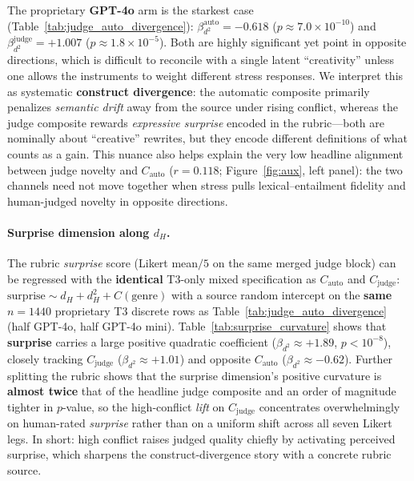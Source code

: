 \documentclass[sigconf,nonacm]{acmart}
\begin{document}
The proprietary \textbf{GPT-4o} arm is the starkest case (Table~\ref{tab:judge_auto_divergence}): $\beta_{d^2}^{\mathrm{auto}}{=}{-}0.618$ ($p{\approx}7.0{\times}10^{-10}$) and $\beta_{d^2}^{\mathrm{judge}}{=}{+}1.007$ ($p{\approx}1.8{\times}10^{-5}$).
Both are highly significant yet point in opposite directions, which is difficult to reconcile with a single latent ``creativity'' unless one allows the instruments to weight different stress responses.
We interpret this as systematic \textbf{construct divergence}: the automatic composite primarily penalizes \emph{semantic drift} away from the source under rising conflict, whereas the judge composite rewards \emph{expressive surprise} encoded in the rubric---both are nominally about ``creative'' rewrites, but they encode different definitions of what counts as a gain.
This nuance also helps explain the very low headline alignment between judge novelty and $C_{\mathrm{auto}}$ ($r{=}0.118$; Figure~\ref{fig:aux}, left panel): the two channels need not move together when stress pulls lexical--entailment fidelity and human-judged novelty in opposite directions.

\paragraph{Surprise dimension along $d_H$.}
The rubric \emph{surprise} score (Likert mean$/5$ on the same merged judge block) can be regressed with the \textbf{identical} T3-only mixed specification as $C_{\mathrm{auto}}$ and $C_{\mathrm{judge}}$: $\mathrm{surprise}{\sim} d_H{+}d_H^2{+}C(\mathrm{genre})$ with a source random intercept on the \textbf{same} $n{=}1440$ proprietary T3 discrete rows as Table~\ref{tab:judge_auto_divergence} (half GPT-4o, half GPT-4o mini).
Table~\ref{tab:surprise_curvature} shows that \textbf{surprise} carries a large positive quadratic coefficient ($\beta_{d^2}{\approx}{+}1.89$, $p{<}10^{-8}$), closely tracking $C_{\mathrm{judge}}$ ($\beta_{d^2}{\approx}{+}1.01$) and opposite $C_{\mathrm{auto}}$ ($\beta_{d^2}{\approx}{-}0.62$).
Further splitting the rubric shows that the surprise dimension's positive curvature is \textbf{almost twice} that of the headline judge composite and an order of magnitude tighter in $p$-value, so the high-conflict \emph{lift} on $C_{\mathrm{judge}}$ concentrates overwhelmingly on human-rated \emph{surprise} rather than on a uniform shift across all seven Likert legs.
In short: high conflict raises judged quality chiefly by activating perceived surprise, which sharpens the construct-divergence story with a concrete rubric source.
\end{document}
